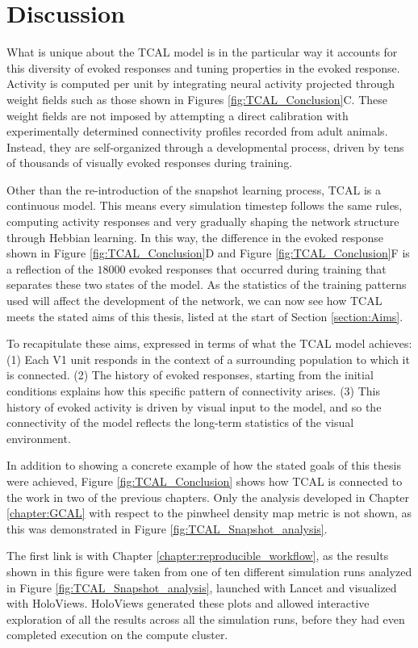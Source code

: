 \documentclass[phd,ianc,twoside]{infthesis}
\begin{document}
\section{Discussion}

What is unique about the TCAL model is in the particular way it accounts
for this diversity of evoked responses and tuning properties in the
evoked response. Activity is computed per unit by integrating neural
activity projected through weight fields such as those shown in Figures
\ref{fig:TCAL_Conclusion}C. These weight fields are not imposed by
attempting a direct calibration with experimentally determined
connectivity profiles recorded from adult animals. Instead, they are
self-organized through a developmental process, driven by tens of
thousands of visually evoked responses during training.

Other than the re-introduction of the snapshot learning process, TCAL is
a continuous model. This means every simulation timestep follows the
same rules, computing activity responses and very gradually shaping the
network structure through Hebbian learning. In this way, the difference
in the evoked response shown in Figure \ref{fig:TCAL_Conclusion}D and
Figure \ref{fig:TCAL_Conclusion}F is a reflection of the $18000$ evoked
responses that occurred during training that separates these two states
of the model. As the statistics of the training patterns used will
affect the development of the network, we can now see how TCAL meets the
stated aims of this thesis, listed at the start of Section
\ref{section:Aims}.

To recapitulate these aims, expressed in terms of what the TCAL model
achieves: (1) Each V1 unit responds in the context of a surrounding
population to which it is connected. (2) The history of evoked
responses, starting from the initial conditions explains how this
specific pattern of connectivity arises. (3) This history of evoked
activity is driven by visual input to the model, and so the
connectivity of the model reflects the long-term statistics of the
visual environment.

In addition to showing a concrete example of how the stated goals of
this thesis were achieved, Figure \ref{fig:TCAL_Conclusion} shows how
TCAL is connected to the work in two of the previous chapters. Only the
analysis developed in Chapter \ref{chapter:GCAL} with respect to the
pinwheel density map metric is not shown, as this was demonstrated in
Figure \ref{fig:TCAL_Snapshot_analysis}.

The first link is with Chapter \ref{chapter:reproducible_workflow}, as
the results shown in this figure were taken from one of ten different
simulation runs analyzed in Figure \ref{fig:TCAL_Snapshot_analysis},
launched with Lancet and visualized with HoloViews. HoloViews generated
these plots and allowed interactive exploration of all the results
across all the simulation runs, before they had even completed execution
on the compute cluster.
\end{document}
